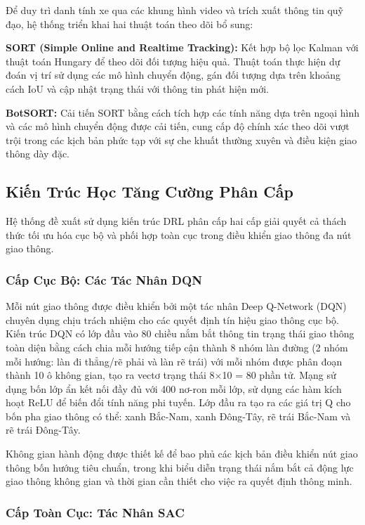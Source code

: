 Để duy trì danh tính xe qua các khung hình video và trích xuất thông tin quỹ đạo, hệ thống triển khai 
hai thuật toán theo dõi bổ sung:

\textbf{SORT (Simple Online and Realtime Tracking):} Kết hợp bộ lọc Kalman với thuật toán Hungary để 
theo dõi đối tượng hiệu quả. Thuật toán thực hiện dự đoán vị trí sử dụng các mô hình chuyển động, 
gán đối tượng dựa trên khoảng cách IoU và cập nhật trạng thái với thông tin phát hiện mới.

\textbf{BotSORT:} Cải tiến SORT bằng cách tích hợp các tính năng dựa trên ngoại hình và các mô hình 
chuyển động được cải tiến, cung cấp độ chính xác theo dõi vượt trội trong các kịch bản phức tạp 
với sự che khuất thường xuyên và điều kiện giao thông dày đặc.

\subsection{Kiến Trúc Học Tăng Cường Phân Cấp}\label{subsec2a-3}

Hệ thống đề xuất sử dụng kiến trúc DRL phân cấp hai cấp giải quyết cả thách thức tối ưu hóa cục bộ 
và phối hợp toàn cục trong điều khiển giao thông đa nút giao thông.

\subsubsection{Cấp Cục Bộ: Các Tác Nhân DQN}

Mỗi nút giao thông được điều khiển bởi một tác nhân Deep Q-Network (DQN) chuyên dụng chịu trách nhiệm 
cho các quyết định tín hiệu giao thông cục bộ. Kiến trúc DQN có lớp đầu vào 80 chiều nắm bắt thông tin 
trạng thái giao thông toàn diện bằng cách chia mỗi hướng tiếp cận thành 8 nhóm làn đường (2 nhóm mỗi hướng: 
làn đi thẳng/rẽ phải và làn rẽ trái) với mỗi nhóm được phân đoạn thành 10 ô không gian, tạo ra vectơ 
trạng thái 8×10 = 80 phần tử. Mạng sử dụng bốn lớp ẩn kết nối đầy đủ với 400 nơ-ron mỗi lớp, 
sử dụng các hàm kích hoạt ReLU để biến đổi tính năng phi tuyến. Lớp đầu ra tạo ra các giá trị Q 
cho bốn pha giao thông có thể: xanh Bắc-Nam, xanh Đông-Tây, rẽ trái Bắc-Nam và rẽ trái Đông-Tây.

Không gian hành động được thiết kế để bao phủ các kịch bản điều khiển nút giao thông bốn hướng tiêu chuẩn, 
trong khi biểu diễn trạng thái nắm bắt cả động lực giao thông không gian và thời gian cần thiết 
cho việc ra quyết định thông minh.

\subsubsection{Cấp Toàn Cục: Tác Nhân SAC}

